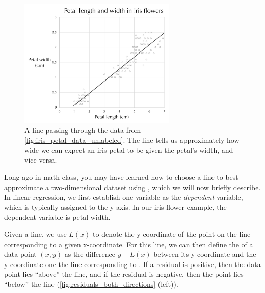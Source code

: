 \begin{figure}[h]
\centering
\mySfFamily
\includegraphics[width = 0.67\textwidth]{../images/iris_flowers_regression_line.png}
\caption{A line passing through the data from \autoref{fig:iris_petal_data_unlabeled}. The line tells us approximately how wide we can expect an iris petal to be given the petal's width, and vice-versa.}
\label{fig:iris_flowers_regression_line}
\end{figure}

\begin{qbox}\end{qbox}

Long ago in math class, you may have learned how to choose a line to best approximate a two-dimensional dataset using , which we will now briefly describe. In linear regression, we first establish one variable as the \textit{dependent} variable, which is typically assigned to the y-axis. In our iris flower example, the dependent variable is petal width.

Given a line, we use $L(x)$ to denote the y-coordinate of the point on the line corresponding to a given x-coordinate. For this line, we can then define the  of a data point $(x, y)$ as the difference $y - L(x)$ between its y-coordinate and the y-coordinate one the line corresponding to . If a residual is positive, then the data point lies ``above'' the line, and if the residual is negative, then the point lies ``below'' the line (\autoref{fig:residuals_both_directions} (left)).\\


